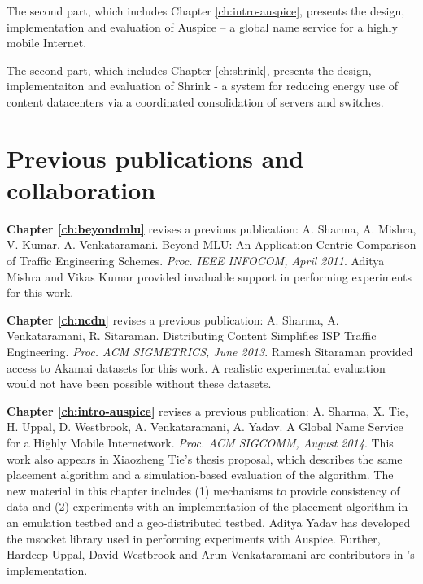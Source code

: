 The second part, which includes Chapter \ref{ch:intro-auspice}, presents the design, implementation and evaluation of Auspice -- a global name service for a highly mobile Internet.

The second part, which includes Chapter \ref{ch:shrink}, presents the design, implementaiton and evaluation of Shrink - a system for reducing energy use of content datacenters via a coordinated consolidation of servers and switches.

\section{Previous publications and collaboration}

\textbf{Chapter \ref{ch:beyondmlu}} revises a previous publication: A. Sharma, A. Mishra, V. Kumar, A. Venkataramani. Beyond MLU: An Application-Centric Comparison of Traffic Engineering Schemes. \emph{Proc. IEEE INFOCOM, April 2011}. Aditya Mishra and Vikas Kumar provided invaluable support in performing experiments for this work.

\textbf{Chapter \ref{ch:ncdn}} revises a previous publication: A. Sharma, A. Venkataramani, R. Sitaraman. Distributing Content Simplifies ISP Traffic Engineering. \emph{Proc. ACM SIGMETRICS, June 2013}. Ramesh Sitaraman provided access to Akamai datasets for this work. A realistic experimental evaluation would not have been possible without these datasets.

\textbf{Chapter \ref{ch:intro-auspice}} revises a previous publication: A. Sharma, X. Tie, H. Uppal, D. Westbrook, A. Venkataramani, A. Yadav. A Global Name Service for a Highly Mobile Internetwork. \emph{Proc. ACM SIGCOMM, August 2014}. 
This work also appears in Xiaozheng Tie's thesis proposal, which describes the same placement algorithm and a simulation-based evaluation of the algorithm. The new material in this chapter includes (1) mechanisms to provide consistency of data and (2) experiments with an implementation of the placement algorithm in an emulation testbed and a geo-distributed testbed. Aditya Yadav has developed the msocket  library used in performing experiments with Auspice. Further, Hardeep Uppal, David Westbrook and Arun Venkataramani are contributors in \auspice's implementation.
